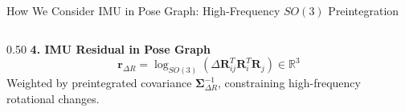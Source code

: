\documentclass[aspectratio=169, 10pt]{beamer}
\begin{document}
\begin{frame}{How We Consider IMU in Pose Graph: High-Frequency $SO(3)$ Preintegration}
\begin{columns}[T]
\begin{column}{0.50\textwidth}
      \vspace{0.15cm}
      {\small \textbf{\textcolor{NavyBlue}{4. IMU Residual in Pose Graph}}}
      \begin{equation}
        \mathbf{r}_{\Delta R} = \log_{SO(3)}\left( \Delta \mathbf{R}_{ij}^T \mathbf{R}_i^T \mathbf{R}_j \right) \in \mathbb{R}^3
      \end{equation}
      Weighted by preintegrated covariance $\mathbf{\Sigma}_{\Delta R}^{-1}$, constraining high-frequency rotational changes.
    \end{column}
  \end{columns}
\end{frame}

\end{document}
